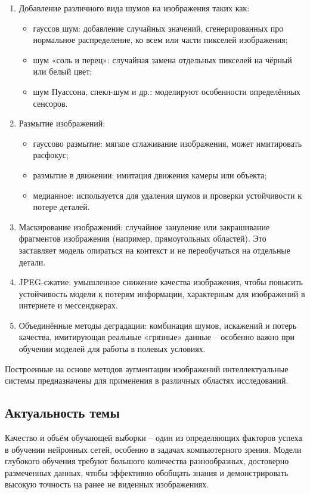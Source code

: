 \begin{enumerate}
	\item Добавление различного вида шумов на изображения таких как:
	\begin{itemize}
	\item гауссов шум: добавление случайных значений, сгенерированных про нормальное распределение, ко всем или части пикселей изображения;
	\item шум «соль и перец»: случайная замена отдельных пикселей на чёрный или белый цвет;
	\item шум Пуассона, спекл-шум и др.: моделируют особенности определённых сенсоров.
	\end{itemize}
	\item Размытие изображений:
	\begin{itemize}
	\item гауссово размытие: мягкое сглаживание изображения, может имитировать расфокус;
	\item размытие в движении: имитация движения камеры или объекта;
	\item медианное: используется для удаления шумов и проверки устойчивости к потере деталей.
	\end{itemize}
	\item Маскирование изображений: случайное зануление или закрашивание фрагментов изображения (например, прямоугольных областей). Это заставляет модель опираться на контекст и не переобучаться на отдельные детали.
	\item JPEG-сжатие: умышленное снижение качества изображения, чтобы повысить устойчивость модели к потерям информации, характерным для изображений в интернете и мессенджерах.
	\item Объединённые методы деградации: комбинация шумов, искажений и потерь качества, имитирующая реальные «грязные» данные – особенно важно при обучении моделей для работы в полевых условиях.
\end{enumerate}

Построенные на основе методов аугментации изображений интеллектуальные системы предназначены для применения в различных областях исследований.

\subsection{Актуальность темы}

Качество и объём обучающей выборки – один из определяющих факторов успеха в обучении нейронных сетей, особенно в задачах компьютерного зрения. Модели глубокого обучения требуют большого количества разнообразных, достоверно размеченных данных, чтобы эффективно обобщать знания и демонстрировать высокую точность на ранее не виденных изображениях.



